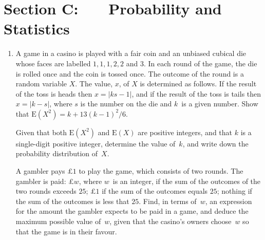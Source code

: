 \documentclass[a4, 11pt]{report}
\newlength{\qspace}
\newcounter{qnumber}
\newenvironment{question}%
 {\vspace{\qspace}
  \begin{enumerate}[\bfseries 1\quad][10]%
    \setcounter{enumi}{\value{qnumber}}%
    \item%
 }
{
  \end{enumerate}
  \filbreak
  \stepcounter{qnumber}
 }
\renewcommand{\.}[1]{\ensuremath{\mathrm{#1}}}
\newcommand{\+}[1]{\ensuremath{\mathbf{#1}}}
\begin{document}
	
	\newpage
\section*{Section C: \ \ \ Probability and Statistics}


\begin{question}
  A game in a casino is played with a fair coin and an unbiased
  cubical die whose faces are labelled $1, 1, 1, 2, 2$ and $3.$  In each
  round of the game, the die is rolled once and the coin is tossed
  once. The outcome of the round is a random variable $X$. The value,
  $x$, of $X$ is determined as follows. If the result of the toss is
  heads then $x= \vert ks -1\vert$, and if the result of the toss is
  tails then $x=\vert k-s\vert$, where $s$ is the number on the die
  and $k$~is a given number.  Show that $\.E(X^2) = k +13(k-1)^2 /6$.

  Given that both $\.E(X^2)$ and $\.E(X)$ are positive integers, and
  that $k$ is a single-digit positive integer, determine the value
  of~$k$, and write down the probability distribution of~$X$.

  A gambler pays  $\pounds 1$ to play the game, which
  consists of two rounds. The gambler is paid:
\newline\hspace*{1cm}
 $\pounds w$, where $w$~is an integer, if 
the sum of the outcomes of the two rounds
  exceeds $25$;
\newline\hspace*{1cm}
 $\pounds 1$ if the sum of the outcomes equals $25$;
\newline\hspace*{1cm}
nothing if the sum of the outcomes is less that $25$.
\newline   
Find, in terms of~$w$, an expression
  for the amount the gambler expects to be paid in a game, and deduce
  the maximum possible value of~$w$, given that the casino's owners
 choose~$w$
  so that the game is in their favour.
\end{question}
\end{document}
